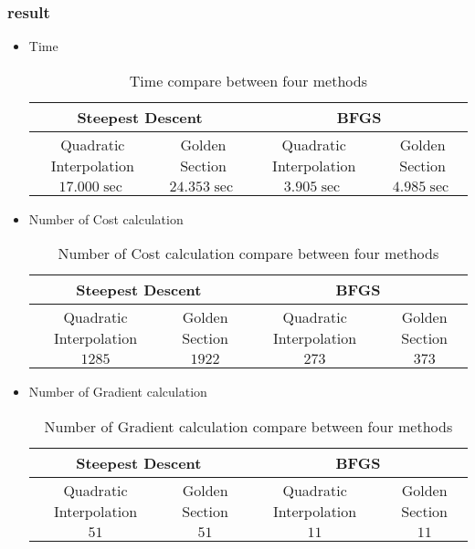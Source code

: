 \subsubsection{result}
\begin{itemize}
	\item Time
	\begin{table}[h]
		\caption {Time compare between four methods} 
		\begin{center}
			\begin{tabular}{ |c|c|c|c| }
				\hline
				\multicolumn{2}{|c|}{Steepest Descent} &
				\multicolumn{2}{|c|}{BFGS} \Tstrut\\
				\hline
				Quadratic Interpolation & Golden Section & Quadratic Interpolation &
				Golden Section \Tstrut\\
				\hline
				$17.000\sec$ & $24.353\sec$ & $3.905\sec$ & $4.985\sec$\Tstrut\\
				\hline
			\end{tabular}
		\end{center}
	\end{table}
	\item Number of Cost calculation
	\begin{table}[h]
		\caption {Number of Cost calculation compare between four methods} 
		\begin{center}
			\begin{tabular}{ |c|c|c|c| }
				\hline
				\multicolumn{2}{|c|}{Steepest Descent} &
				\multicolumn{2}{|c|}{BFGS} \Tstrut\\
				\hline
				Quadratic Interpolation & Golden Section & Quadratic Interpolation &
				Golden Section \Tstrut\\
				\hline
				$1285$ & $1922$ & $273$ & $373$\Tstrut\\
				\hline
			\end{tabular}
		\end{center}
	\end{table}
	\item Number of Gradient calculation
	\begin{table}[h]
		\caption {Number of Gradient calculation compare between four methods} 
		\begin{center}
			\begin{tabular}{ |c|c|c|c| }
				\hline
				\multicolumn{2}{|c|}{Steepest Descent} &
				\multicolumn{2}{|c|}{BFGS} \Tstrut\\
				\hline
				Quadratic Interpolation & Golden Section & Quadratic Interpolation &
				Golden Section \Tstrut\\
				\hline
				$51$ & $51$ & $11$ & $11$\Tstrut\\
				\hline
			\end{tabular}
		\end{center}
	\end{table}
\end{itemize}
